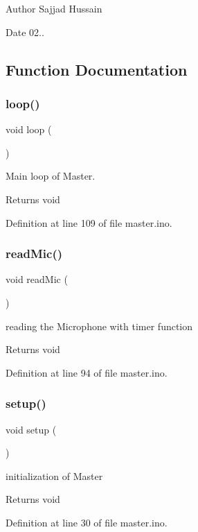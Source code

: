 \begin{DoxyAuthor}{Author}
Sajjad Hussain
\end{DoxyAuthor}
\begin{DoxyDate}{Date}
02.. 
\end{DoxyDate}


\subsection{Function Documentation}
\mbox{\label{master_8ino_afe461d27b9c48d5921c00d521181f12f}} 
\subsubsection{\texorpdfstring{loop()}{loop()}}
{\footnotesize\ttfamily void loop (\begin{DoxyParamCaption}{ }\end{DoxyParamCaption})}



Main loop of Master. 

\begin{DoxyReturn}{Returns}
void 
\end{DoxyReturn}


Definition at line 109 of file master.\+ino.

\mbox{\label{master_8ino_acb567cd7c0b4da511205a0194cb9da81}} 
\subsubsection{\texorpdfstring{readMic()}{readMic()}}
{\footnotesize\ttfamily void read\+Mic (\begin{DoxyParamCaption}{ }\end{DoxyParamCaption})}



reading the Microphone with timer function 

\begin{DoxyReturn}{Returns}
void 
\end{DoxyReturn}


Definition at line 94 of file master.\+ino.

\mbox{\label{master_8ino_a4fc01d736fe50cf5b977f755b675f11d}} 
\subsubsection{\texorpdfstring{setup()}{setup()}}
{\footnotesize\ttfamily void setup (\begin{DoxyParamCaption}{ }\end{DoxyParamCaption})}



initialization of Master 

\begin{DoxyReturn}{Returns}
void 
\end{DoxyReturn}


Definition at line 30 of file master.\+ino.

